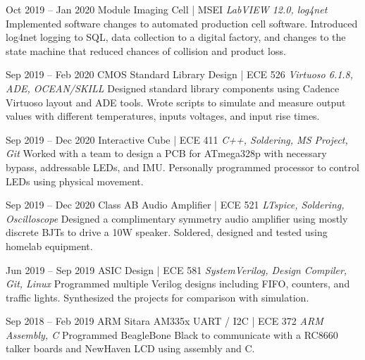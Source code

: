\documentclass[letterpaper]{moderncv}        %
\begin{document}
\cventry
{Oct 2019 -- Jan 2020}
{Module Imaging Cell | MSEI}
{}
{\textit{LabVIEW 12.0, log4net}}
{}
{Implemented software changes to automated production cell software.  Introduced log4net logging to SQL, data collection to a digital factory, and changes to the state machine that reduced chances of collision and product loss.\\}

\cventry
{Sep 2019 -- Feb 2020}
{CMOS Standard Library Design | ECE 526}
{}
{\textit{Virtuoso 6.1.8, ADE, OCEAN/SKILL}}
{}
{Designed standard library components using Cadence Virtuoso layout and ADE tools.  Wrote scripts to simulate and measure output values with different temperatures, inputs voltages, and input rise times.\\}	

\cventry
{Sep 2019 -- Dec 2020}
{Interactive Cube | ECE 411}
{}
{\textit{C++, Soldering, MS Project, Git}}
{}
{Worked with a team to design a PCB for ATmega328p with necessary bypass, addressable LEDs, and IMU. Personally programmed processor to control LEDs using physical movement.\\}	
	
\cventry
{Sep 2019 -- Dec 2020}
{Class AB Audio Amplifier | ECE 521}
{}
{\textit{LTspice, Soldering, Oscilloscope}}
{}
{Designed a complimentary symmetry audio amplifier using mostly discrete BJTs to drive a 10W speaker.  Soldered, designed and tested using homelab equipment.\\}	

	
\cventry
{Jun 2019 -- Sep 2019}
{ASIC Design | ECE 581}
{}
{\textit{SystemVerilog, Design Compiler, Git, Linux}}
{}
{Programmed multiple Verilog designs including FIFO, counters, and traffic lights.  Synthesized the projects for comparison with simulation.\\}
	
	
\cventry
{Sep 2018 -- Feb 2019}
{ARM Sitara AM335x UART / I2C | ECE 372}
{}
{\textit{ARM Assembly, C}}
{}
{Programmed BeagleBone Black to communicate with a RC8660 talker boards and NewHaven LCD using assembly and C.\\}			
\end{document}
